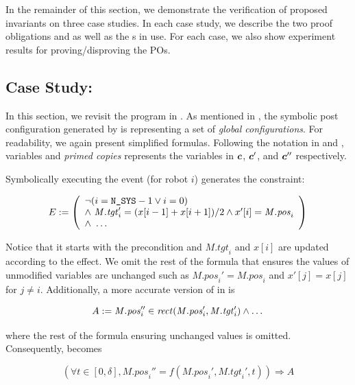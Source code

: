 In the remainder of this section,
we demonstrate the verification of proposed invariants on three case studies.
In each case study, we describe the two proof obligations  and 
as well as the \portasum{}s in use.
For each case, we also show experiment results for proving/disproving the POs.


\subsection{Case Study: \LineForm}

\newcommand{\Mposi}{\mathit{M.pos}_i}
\newcommand{\Mtgti}{\mathit{M.tgt}_i}

In this section, we revisit the \LineForm program in .
As mentioned in , the symbolic post configuration generated by \K is representing a set of \emph{global configurations}.
For readability, we again present simplified formulas.
Following the notation in  and ,
variables and \emph{primed copies} represents the variables in $\mathit{\boldsymbol{c}}$, $\mathit{\boldsymbol{c}}'$, and $\mathit{\boldsymbol{c}}''$ respectively.

Symbolically executing the event  (for robot $i$) generates the constraint:
\begin{small}
\[
E :=
\left(
\begin{array}{l}
    \neg (i = \NMAX - 1 \lor i = 0) \\
    \land\ \Mtgti' = (x[i-1] + x[i+1])/2 \land x'[i] = \Mposi \\
    \land\ \dots
\end{array}
\right)
\]
\end{small}%
Notice that it starts with the precondition and $\Mtgti$ and $x[i]$ are updated according to the effect.
We omit the rest of the formula that ensures the values of unmodified variables are unchanged
such as $\Mposi'=\Mposi$ and $x'[j]=x[j]$ for $j\neq i$.
Additionally, a more accurate version of  in  is
\begin{assumption}
\[
    A := \Mposi'' \in \rect(\Mposi', \Mtgti') \land \dots
\]
\end{assumption}
\noindent where the rest of the formula ensuring unchanged values is omitted.
Consequently,  becomes
\begin{proofob}
\[
(\forall t \in [0,\delta], \Mposi'' = f(\Mposi', \Mtgti', t)) \Rightarrow A
\]
\end{proofob}

